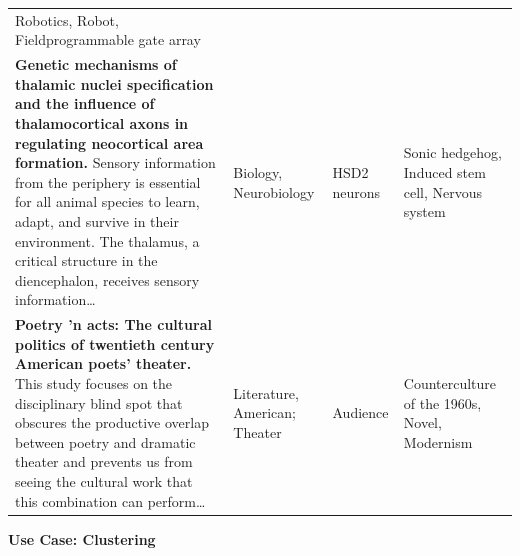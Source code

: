 \documentclass[]{krantz}
\begin{document}
\begin{longtable}[]{@{}llll@{}}
\begin{minipage}[t]{0.09\columnwidth}
Robotics, Robot, Fieldprogrammable gate array\strut
\end{minipage}\tabularnewline
\begin{minipage}[t]{0.64\columnwidth}\raggedright\strut
\textbf{Genetic mechanisms of thalamic nuclei specification and the
influence of thalamocortical axons in regulating neocortical area
formation.} Sensory information from the periphery is essential for all
animal species to learn, adapt, and survive in their environment. The
thalamus, a critical structure in the diencephalon, receives sensory
information\ldots{}\strut
\end{minipage} & \begin{minipage}[t]{0.12\columnwidth}\raggedright\strut
Biology, Neurobiology\strut
\end{minipage} & \begin{minipage}[t]{0.03\columnwidth}\raggedright\strut
HSD2 neurons\strut
\end{minipage} & \begin{minipage}[t]{0.09\columnwidth}\raggedright\strut
Sonic hedgehog, Induced stem cell, Nervous system\strut
\end{minipage}\tabularnewline
\begin{minipage}[t]{0.64\columnwidth}\raggedright\strut
\textbf{Poetry 'n acts: The cultural politics of twentieth century
American poets' theater.} This study focuses on the disciplinary blind
spot that obscures the productive overlap between poetry and dramatic
theater and prevents us from seeing the cultural work that this
combination can perform\ldots{}\strut
\end{minipage} & \begin{minipage}[t]{0.12\columnwidth}\raggedright\strut
Literature, American; Theater\strut
\end{minipage} & \begin{minipage}[t]{0.03\columnwidth}\raggedright\strut
Audience\strut
\end{minipage} & \begin{minipage}[t]{0.09\columnwidth}\raggedright\strut
Counterculture of the 1960s, Novel, Modernism\strut
\end{minipage}\tabularnewline
\bottomrule
\end{longtable}

\textbf{Use Case: Clustering}
\end{document}
